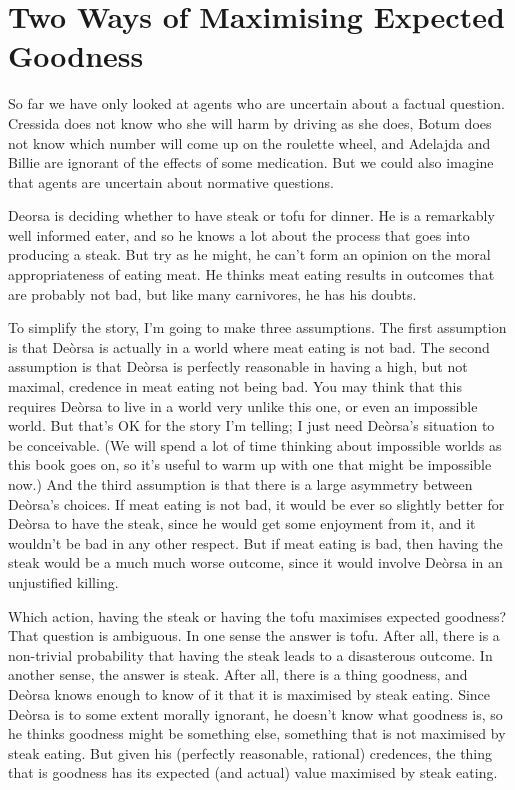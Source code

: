 \section{Two Ways of Maximising Expected Goodness}
\label{twowaysofmaximisingexpectedgoodness}

So far we have only looked at agents who are uncertain about a factual question. \gls{Cressida} does not know who she will harm by driving as she does, \gls{Botum} does not know which number will come up on the roulette wheel, and \gls{Adelajda} and \gls{Billie} are ignorant of the effects of some medication. But we could also imagine that agents are uncertain about normative questions.

\gls{Deorsa} is deciding whether to have steak or tofu for dinner. He is a remarkably well informed eater, and so he knows a lot about the process that goes into producing a steak. But try as he might, he can't form an opinion on the moral appropriateness of eating meat. He thinks meat eating results in outcomes that are probably not bad, but like many carnivores, he has his doubts.

To simplify the story, I'm going to make three assumptions. The first assumption is that Deòrsa is actually in a world where meat eating is not bad. The second assumption is that Deòrsa is perfectly reasonable in having a high, but not maximal, credence in meat eating not being bad. You may think that this requires Deòrsa to live in a world very unlike this one, or even an impossible world. But that's OK for the story I'm telling; I just need Deòrsa's situation to be conceivable. (We will spend a lot of time thinking about impossible worlds as this book goes on, so it's useful to warm up with one that might be impossible now.) And the third assumption is that there is a large asymmetry between Deòrsa's choices. If meat eating is not bad, it would be ever so slightly better for Deòrsa to have the steak, since he would get some enjoyment from it, and it wouldn't be bad in any other respect. But if meat eating is bad, then having the steak would be a much much worse outcome, since it would involve Deòrsa in an unjustified killing.

Which action, having the steak or having the tofu maximises expected goodness? That question is ambiguous. In one sense the answer is tofu. After all, there is a non-trivial probability that having the steak leads to a disasterous outcome. In another sense, the answer is steak. After all, there is a thing goodness, and Deòrsa knows enough to know of it that it is maximised by steak eating. Since Deòrsa is to some extent morally ignorant, he doesn't know what goodness is, so he thinks goodness might be something else, something that is not maximised by steak eating. But given his (perfectly reasonable, rational) credences, the thing that is goodness has its expected (and actual) value maximised by steak eating.

